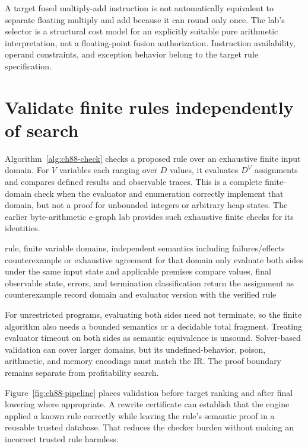 A target fused multiply-add instruction is not automatically equivalent to separate floating multiply and add because it can round only once.
The lab's selector is a structural cost model for an explicitly suitable pure arithmetic interpretation, not a floating-point fusion authorization.
Instruction availability, operand constraints, and exception behavior belong to the target rule specification.

\section{Validate finite rules independently of search}
\label{sec:ch88-validation}
Algorithm~\ref{alg:ch88-check} checks a proposed rule over an exhaustive finite input domain.
For $V$ variables each ranging over $D$ values, it evaluates $D^V$ assignments and compares defined results and observable traces.
This is a complete finite-domain check when the evaluator and enumeration correctly implement that domain, but not a proof for unbounded integers or arbitrary heap states.
The earlier byte-arithmetic e-graph lab provides such exhaustive finite checks for its identities.

\begin{algorithm}[htbp]
\caption{Validate a rewrite over a stated finite semantic domain.}
\label{alg:ch88-check}
\begin{pseudocode}
\Require rule, finite variable domains, independent semantics including failures/effects
\Ensure counterexample or exhaustive agreement for that domain only
\State evaluate both sides under the same input state and applicable premises
\State compare values, final observable state, errors, and termination classification
 \State return the assignment as counterexample \EndIf
\EndFor
\State record domain and evaluator version with the verified rule
\end{pseudocode}
\end{algorithm}

For unrestricted programs, evaluating both sides need not terminate, so the finite algorithm also needs a bounded semantics or a decidable total fragment.
Treating evaluator timeout on both sides as semantic equivalence is unsound.
Solver-based validation can cover larger domains, but its undefined-behavior, poison, arithmetic, and memory encodings must match the IR.
The proof boundary remains separate from profitability search.

Figure~\ref{fig:ch88-pipeline} places validation before target ranking and after final lowering where appropriate.
A rewrite certificate can establish that the engine applied a known rule correctly while leaving the rule's semantic proof in a reusable trusted database.
That reduces the checker burden without making an incorrect trusted rule harmless.

